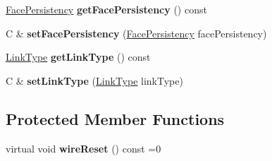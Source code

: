 \begin{DoxyCompactItemize}
\item 
\hyperlink{group__management_ga05df4b7c484a0fae25d3e65962511bac}{Face\+Persistency} {\bfseries get\+Face\+Persistency} () const\hypertarget{classndn_1_1nfd_1_1FaceTraits_a9e46f263406a7106838ee0305ef05129}{}\label{classndn_1_1nfd_1_1FaceTraits_a9e46f263406a7106838ee0305ef05129}

\item 
C \& {\bfseries set\+Face\+Persistency} (\hyperlink{group__management_ga05df4b7c484a0fae25d3e65962511bac}{Face\+Persistency} face\+Persistency)\hypertarget{classndn_1_1nfd_1_1FaceTraits_aa4eff48b6ccce8bcf54312d8c6ced540}{}\label{classndn_1_1nfd_1_1FaceTraits_aa4eff48b6ccce8bcf54312d8c6ced540}

\item 
\hyperlink{group__management_gaa49a53cb4fe262ed33b001ccbe9c3502}{Link\+Type} {\bfseries get\+Link\+Type} () const\hypertarget{classndn_1_1nfd_1_1FaceTraits_afa84059873ae55beb717d4268df36631}{}\label{classndn_1_1nfd_1_1FaceTraits_afa84059873ae55beb717d4268df36631}

\item 
C \& {\bfseries set\+Link\+Type} (\hyperlink{group__management_gaa49a53cb4fe262ed33b001ccbe9c3502}{Link\+Type} link\+Type)\hypertarget{classndn_1_1nfd_1_1FaceTraits_afa38089d2ff22c7175f61cf2d310252a}{}\label{classndn_1_1nfd_1_1FaceTraits_afa38089d2ff22c7175f61cf2d310252a}

\end{DoxyCompactItemize}
\subsection*{Protected Member Functions}
\begin{DoxyCompactItemize}
\item 
virtual void {\bfseries wire\+Reset} () const =0\hypertarget{classndn_1_1nfd_1_1FaceTraits_a58e55b50f57cec66011c395135539464}{}\label{classndn_1_1nfd_1_1FaceTraits_a58e55b50f57cec66011c395135539464}

\end{DoxyCompactItemize}
